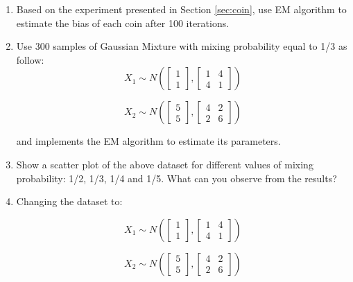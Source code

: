 \begin{enumerate}
    \item Based on the experiment presented in Section \ref{sec:coin}, use EM algorithm to estimate the bias of each coin after 100 iterations.
    \item Use 300 samples of Gaussian Mixture with mixing probability equal to 1/3 as follow:
    \begin{equation*}
        X_1 \sim N\left( \begin{bmatrix} 1 \\ 1 \end{bmatrix}, \begin{bmatrix} 1 & 4 \\ 4 & 1 \end{bmatrix} \right)
    \end{equation*}
    
    \begin{equation*}
        X_2 \sim N\left( \begin{bmatrix} 5 \\ 5 \end{bmatrix}, \begin{bmatrix} 4 & 2 \\ 2 & 6 \end{bmatrix} \right)
    \end{equation*}
    
    \noindent and implements the EM algorithm to estimate its parameters.
    
    \item Show a scatter plot of the above dataset for different values of mixing probability: 1/2, 1/3, 1/4 and 1/5. What can you observe from the results?
    
    \item Changing the dataset to:
    
    \begin{equation*}
        X_1 \sim N\left( \begin{bmatrix} 1 \\ 1 \end{bmatrix}, \begin{bmatrix} 1 & 4 \\ 4 & 1 \end{bmatrix} \right)
    \end{equation*}
    
    \begin{equation*}
        X_2 \sim N\left( \begin{bmatrix} 5 \\ 5 \end{bmatrix}, \begin{bmatrix} 4 & 2 \\ 2 & 6 \end{bmatrix} \right)
    \end{equation*}
    

\end{enumerate}
